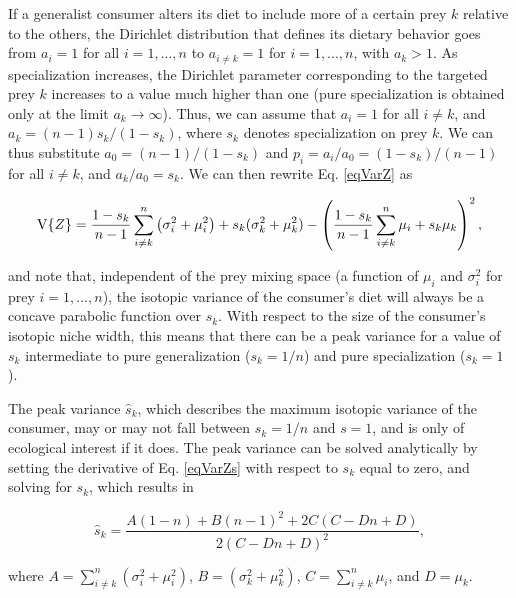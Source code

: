 \documentclass{frontiersSCNS}
\begin{document}
If a generalist consumer alters its diet to include more of a certain prey $k$ relative to the others, the Dirichlet distribution that defines its dietary behavior goes from $a_i=1$ for all $i=1,...,n$ to $a_{i \neq k}=1$ for $i=1,...,n$, with $a_k>1$.
As specialization increases, the Dirichlet parameter corresponding to the targeted prey $k$ increases to a value much higher than one (pure specialization is obtained only at the limit $a_k \to \infty$).
Thus, we can assume that $a_i=1$ for all $i \neq k$, and $a_k = (n-1)s_k/(1-s_k)$, where $s_k$ denotes specialization on prey $k$. %
We can thus substitute $a_0 = (n-1)/(1-s_k)$ and $p_i = a_i/a_0 = (1-s_k)/(n-1)$ for all $i \neq k$, and $a_k/a_0 = s_k$.
We can then rewrite Eq. \ref{eqVarZ} as

\begin{equation}
\label{eqVarZs}
{\rm V}\{Z\} = \frac{1-s_k}{n-1}\sum_{i \neq k}^n \left(\sigma_i^2 + \mu_i^2\right) + s_k(\sigma_k^2 + \mu_k^2) - \left(\frac{1-s_k}{n-1}\sum_{i \neq k}^n \mu_i + s_k\mu_k \right)^2,
\end{equation}

\noindent and note that, independent of the prey mixing space (a function of $\mu_i$ and $\sigma_i^2$ for prey $i=1,...,n$), the isotopic variance of the consumer's diet will always be a concave parabolic function over $s_k$.
With respect to the size of the consumer's isotopic niche width, this means that there can be a peak variance for a value of $s_k$ intermediate to pure generalization ($s_k=1/n$) and pure specialization ($s_k=1$).

The peak variance $\hat s_k$, which describes the maximum isotopic variance of the consumer, may or may not fall between $s_k=1/n$ and $s=1$, and is only of ecological interest if it does.
The peak variance can be solved analytically by setting the derivative of Eq. \ref{eqVarZs} with respect to $s_k$ equal to zero, and solving for $s_k$, which results in

\begin{equation}
	\hat s_k = \frac{A(1-n)+B (n-1)^2+2 C (C-D n+D)}{2 (C-D n+D)^2},
\end{equation}

\noindent where $A = \sum_{i \neq k}^n \left(\sigma_i^2 + \mu_i^2\right)$, $B = \left(\sigma_k^2 + \mu_k^2\right)$, $C = \sum_{i \neq k}^n \mu_i$, and $D = \mu_k$.
\end{document}

